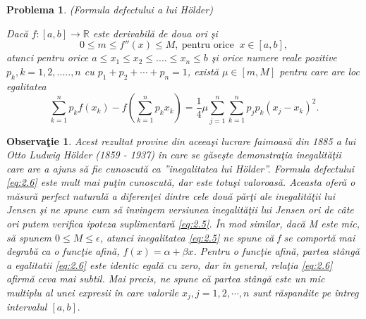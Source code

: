 \documentclass[a4paper,12pt,oneside]{report}
\newtheorem{problem}{Problema}
\newtheorem{remark}{Observa\c{t}ie}
\begin{document}
\begin{problem}
(Formula defectului a lui Hölder)

Dac\u{a} \(f : \left [ a,b  \right ] \to \mathbb{R}\) este derivabil\u{a} de doua ori \c{s}i
\begin{displaymath}
  0 \leq m \leq  f''\left ( x \right ) \leq  M,~ \text{pentru orice }~x\in \left [ a,b \right ], \label{eq:2.5} \tag{2.5}
\end{displaymath}
atunci pentru orice  \(a\leq x_{1}\leq x_{2}\leq ....\leq x_{n} \leq b \) \c{s}i orice numere reale pozitive \(p_{k}, k= 1,2,.....,n \) cu \(p_{1} + p_{2} + \cdots+ p_{n} = 1\),  exist\u{a}  \(\mu \in \left [ m, M \right ]\) pentru care are loc egalitatea
\begin{displaymath}
  \sum_{k = 1}^{n}p_{k}f\left ( x_{k} \right ) - f\left ( \sum_{k = 1}^{n} p_{k}x_{k}\right ) = \frac{1}{4}\mu \sum_{j = 1}^{n}\sum_{k = 1}^{n}p_{j}p_{k}\left ( x_{j} - x_{k} \right )^{2}. \label{eq:2.6} \tag{2.6}
\end{displaymath}
\end{problem}
\begin{remark}
Acest rezultat provine din aceea\c{s}i lucrare faimoas\u{a} din 1885 a lui Otto Ludwig Hölder (1859 - 1937) \^{i}n care se g\u{a}seşte demonstra\c{t}ia inegalit\u{a}ţii care are a ajuns s\u{a} fie cunoscut\u{a}  ca ”inegalitatea lui Hölder”. Formula defectului \ref{eq:2.6} este mult mai pu\c{t}in cunoscut\u{a}, dar este totu\c{s}i valoroas\u{a}. Aceasta ofer\u{a} o m\u{a}sur\u{a} perfect natural\u{a} a diferen\c{t}ei dintre cele dou\u{a} p\u{a}r\c{t}i ale inegalit\u{a}\c{t}ii lui Jensen \c{s}i ne spune cum s\u{a} \^{i}nvingem versiunea  inegalit\u{a}\c{t}ii lui Jensen ori de c\^{a}te ori putem verifica ipoteza suplimentar\u{a} \ref{eq:2.5}.
\^{I}n mod similar, dac\u{a} M este mic, s\u{a} spunem \(0 \leq M \leq \epsilon\), atunci inegalitatea \ref{eq:2.5} ne spune c\u{a} f se comport\u{a} mai degrab\u{a} ca o func\c{t}ie afin\u{a}, \(f\left ( x \right ) = \alpha  + \beta x\). Pentru o func\c{t}ie afin\u{a}, partea st\^{a}ng\u{a} a egalitatii \ref{eq:2.6} este identic egal\u{a} cu zero, dar \^{i}n general, rela\c{t}ia \ref{eq:2.6} afirm\u{a} ceva mai subtil. Mai precis, ne spune c\u{a} partea st\^{a}ng\u{a} este un mic multiplu al unei expresii  \^{i}n care valorile \(x_{j}, j = 1,2,\cdots ,n \) sunt r\u{a}spandite pe \^{i}ntreg intervalul \(\left [ a, b \right ]. \)
\end{remark}
\end{document}
